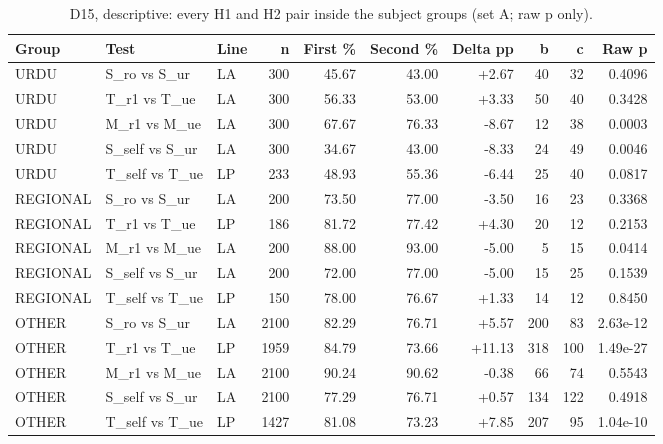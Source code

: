 \begin{table}[t]
\centering
\small
\caption{D15, descriptive: every H1 and H2 pair inside the subject groups (set A; raw p only).}
\label{tab:d15-groups}
\begin{tabular}{lllrrrrrrr}
\toprule
Group & Test & Line & n & First \% & Second \% & Delta pp & b & c & Raw p \\
\midrule
URDU & S\_ro vs S\_ur & LA & 300 & 45.67 & 43.00 & +2.67 & 40 & 32 & 0.4096 \\
URDU & T\_r1 vs T\_ue & LA & 300 & 56.33 & 53.00 & +3.33 & 50 & 40 & 0.3428 \\
URDU & M\_r1 vs M\_ue & LA & 300 & 67.67 & 76.33 & -8.67 & 12 & 38 & 0.0003 \\
URDU & S\_self vs S\_ur & LA & 300 & 34.67 & 43.00 & -8.33 & 24 & 49 & 0.0046 \\
URDU & T\_self vs T\_ue & LP & 233 & 48.93 & 55.36 & -6.44 & 25 & 40 & 0.0817 \\
REGIONAL & S\_ro vs S\_ur & LA & 200 & 73.50 & 77.00 & -3.50 & 16 & 23 & 0.3368 \\
REGIONAL & T\_r1 vs T\_ue & LP & 186 & 81.72 & 77.42 & +4.30 & 20 & 12 & 0.2153 \\
REGIONAL & M\_r1 vs M\_ue & LA & 200 & 88.00 & 93.00 & -5.00 & 5 & 15 & 0.0414 \\
REGIONAL & S\_self vs S\_ur & LA & 200 & 72.00 & 77.00 & -5.00 & 15 & 25 & 0.1539 \\
REGIONAL & T\_self vs T\_ue & LP & 150 & 78.00 & 76.67 & +1.33 & 14 & 12 & 0.8450 \\
OTHER & S\_ro vs S\_ur & LA & 2100 & 82.29 & 76.71 & +5.57 & 200 & 83 & 2.63e-12 \\
OTHER & T\_r1 vs T\_ue & LP & 1959 & 84.79 & 73.66 & +11.13 & 318 & 100 & 1.49e-27 \\
OTHER & M\_r1 vs M\_ue & LA & 2100 & 90.24 & 90.62 & -0.38 & 66 & 74 & 0.5543 \\
OTHER & S\_self vs S\_ur & LA & 2100 & 77.29 & 76.71 & +0.57 & 134 & 122 & 0.4918 \\
OTHER & T\_self vs T\_ue & LP & 1427 & 81.08 & 73.23 & +7.85 & 207 & 95 & 1.04e-10 \\
\bottomrule
\end{tabular}
\end{table}
